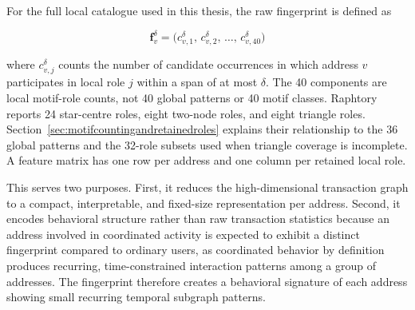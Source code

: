 For the full local catalogue used in this thesis, the raw fingerprint is
defined as

\begin{equation}
    \mathbf{f}_v^{\delta}
      = \bigl(c_{v,1}^{\delta},\,c_{v,2}^{\delta},\,\ldots,\,c_{v,40}^{\delta}\bigr)
    \label{eq:motif_fingerprint}
\end{equation}

where $c_{v,j}^{\delta}$ counts the number of candidate occurrences in which
address $v$ participates in local role $j$ within a span of at most $\delta$.
The 40 components are local motif-role counts, not 40 global patterns or 40
motif classes. Raphtory reports 24 star-centre roles, eight two-node roles, and
eight triangle roles. Section~\ref{sec:motifcountingandretainedroles} explains
their relationship to the 36 global patterns and the 32-role subsets used when
triangle coverage is incomplete. A feature matrix has one row per address and
one column per retained local role.

This serves two purposes. First, it reduces the high-dimensional transaction graph to a compact, interpretable, and fixed-size representation per address. Second, it encodes behavioral structure rather than raw transaction statistics because an address involved in coordinated activity is expected to exhibit a distinct fingerprint compared to ordinary users, as coordinated behavior by definition produces recurring, time-constrained interaction patterns among a group of addresses. The fingerprint therefore creates a behavioral signature of each address showing small recurring temporal subgraph patterns.
